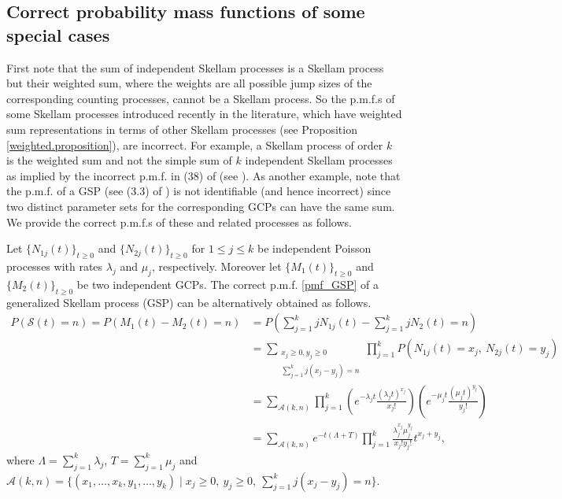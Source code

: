 \documentclass[11pt,oneside,reqno]{amsart}
\theoremstyle{definition}
\theoremstyle{remarkstyle}
\begin{document}
\subsection{Correct probability mass functions of some special cases}

First note that the sum of independent Skellam processes is a Skellam process but their weighted sum, where the weights are all possible jump sizes of the corresponding counting processes, cannot be a Skellam process. So the p.m.f.s of some Skellam processes introduced recently in the literature, which have weighted sum representations in terms of other Skellam processes (see Proposition \ref{weighted.proposition}), are incorrect. For example, a Skellam process of order $k$ is the weighted sum and not the simple sum of $k$ independent Skellam processes as implied by the incorrect p.m.f. in (38) of \citet{Gupta2020} (see \citet{Cinque2025}). As another example, note that the p.m.f. of a GSP (see (3.3) of \citet{Kataria2022b}) is not identifiable (and hence incorrect) since two distinct parameter sets for the corresponding GCPs can have the same sum. We provide the correct p.m.f.s of these and related processes as follows.

 Let $\{N_{1j}(t)\}_{t\ge 0}$ and $\{N_{2j}(t)\}_{t\ge 0}$ for $1\le j\le k$ be independent Poisson processes with rates $\lambda_j$ and $\mu_j$, respectively. Moreover let $\{M_1(t)\}_{t\ge 0}$ and $\{M_2(t)\}_{t\ge 0}$ be two independent GCPs. The correct p.m.f. \eqref{pmf_GSP} of a generalized Skellam process (GSP) can be alternatively obtained as follows.
\begin{align*}
P(\mathcal{S}(t)=n)=P(M_{1}(t)-M_{2}(t)=n)&=P(\sum_{j=1}^{k}jN_{1j}(t)-\sum_{j=1}^{k}jN_{2}(t)=n)\\
&=\sum_{\substack{x_j\ge 0,y_j\ge 0\\\sum_{j=1}^{k}j(x_j-y_j)=n}}\prod_{j=1}^{k}P(N_{1j}(t)=x_j,~N_{2j}(t)=y_j)\\
&=\sum_{\mathcal{A}(k,n)}\prod_{j=1}^{k}(e^{-\lambda_j t}\frac{(\lambda_j t)^{x_j}}{x_j!})(e^{-\mu_j t}\frac{(\mu_j t)^{y_j}}{y_j!})\\
&=\sum_{\mathcal{A}(k,n)}e^{-t(\Lambda+T)}\prod_{j=1}^{k}\frac{\lambda_j^{x_j}\mu_j^{y_j}}{x_j!y_j!}t^{x_j+y_j},
\end{align*}
where $\Lambda=\sum_{j=1}^{k}\lambda_j$, $T=\sum_{j=1}^{k}\mu_j$ and $\displaystyle\mathcal{A}(k,n)= \{(x_1,\dots,x_k,y_1,\dots,y_k)\mid x_j\ge 0,~y_j\ge 0,~\sum_{j=1}^{k}j(x_j-y_j)=n\}$.
\end{document}
